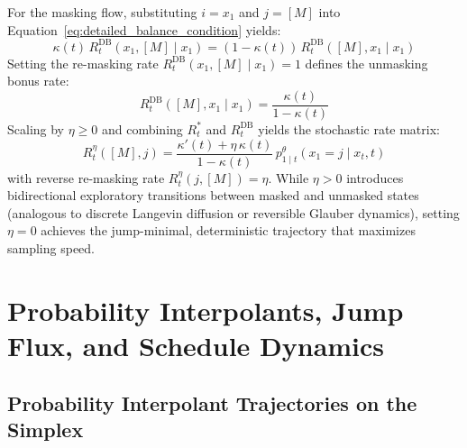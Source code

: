 For the masking flow, substituting $i = x_1$ and $j = [M]$ into Equation~\ref{eq:detailed_balance_condition} yields:
\begin{equation}
\kappa(t) \, R_t^{\text{DB}}(x_1, [M] \mid x_1) = (1 - \kappa(t)) \, R_t^{\text{DB}}([M], x_1 \mid x_1)
\label{eq:db_mask_relation}
\end{equation}
Setting the re-masking rate $R_t^{\text{DB}}(x_1, [M] \mid x_1) = 1$ defines the unmasking bonus rate:
\begin{equation}
R_t^{\text{DB}}([M], x_1 \mid x_1) = \frac{\kappa(t)}{1 - \kappa(t)}
\label{eq:db_bonus_unmask}
\end{equation}
Scaling by $\eta \ge 0$ and combining $R_t^*$ and $R_t^{\text{DB}}$ yields the stochastic rate matrix:
\begin{equation}
R_t^\eta([M], j) = \frac{\kappa'(t) + \eta \, \kappa(t)}{1 - \kappa(t)} \, p_{1 \mid t}^\theta(x_1 = j \mid x_t, t)
\label{eq:stochastic_unmask_rate}
\end{equation}
with reverse re-masking rate $R_t^\eta(j, [M]) = \eta$. While $\eta > 0$ introduces bidirectional exploratory transitions between masked and unmasked states (analogous to discrete Langevin diffusion or reversible Glauber dynamics), setting $\eta = 0$ achieves the jump-minimal, deterministic trajectory that maximizes sampling speed.

\section{Probability Interpolants, Jump Flux, and Schedule Dynamics}

\subsection{Probability Interpolant Trajectories on the Simplex}

